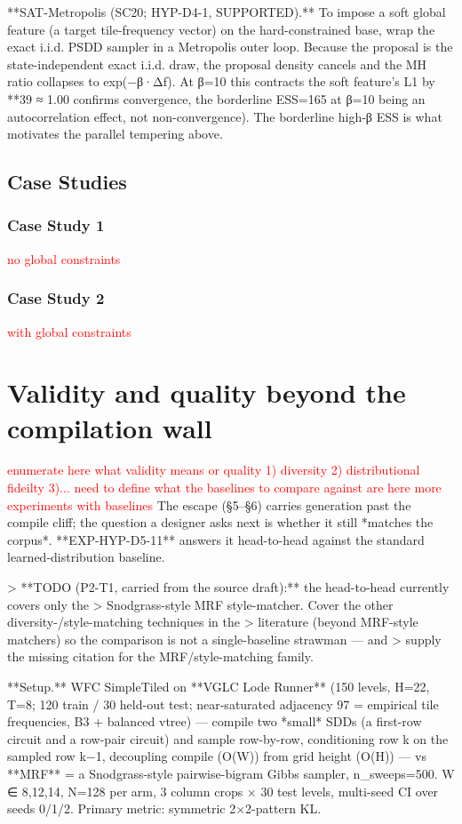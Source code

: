 \documentclass[letterpaper]{article} %
\newcommand{\todo}[1]{\textcolor{red}{#1}}
\begin{document}
**SAT-Metropolis (SC20; HYP-D4-1, SUPPORTED).** To impose a soft global feature (a target
tile-frequency vector) on the hard-constrained base, wrap the exact i.i.d. PSDD sampler in a
Metropolis outer loop. Because the proposal is the state-independent exact i.i.d. draw, the proposal
density cancels and the MH ratio collapses to exp(−β·Δf). At β=10 this contracts the soft feature's
L1 by **39%
≈ 1.00 confirms convergence, the borderline ESS=165 at β=10 being an autocorrelation effect, not
non-convergence). The borderline high-β ESS is what motivates the parallel tempering above.

\subsection{Case Studies}
\subsubsection{Case Study 1}
\todo{no global constraints}
\subsubsection{Case Study 2}
\todo{with global constraints}
\section{Validity and quality beyond the compilation wall}
\todo{enumerate here what validity means or quality 1) diversity 2) distributional fideilty 3)...}
\todo{need to define what the baselines to compare against are here}
\todo{more experiments with baselines}
The escape (§5–§6) carries generation past the compile cliff; the question a designer asks next is
whether it still *matches the corpus*. **EXP-HYP-D5-11** answers it head-to-head against the standard
learned-distribution baseline.

> **TODO (P2-T1, carried from the source draft):** the head-to-head currently covers only the
> Snodgrass-style MRF style-matcher. Cover the other diversity-/style-matching techniques in the
> literature (beyond MRF-style matchers) so the comparison is not a single-baseline strawman — and
> supply the missing citation for the MRF/style-matching family.

**Setup.** WFC SimpleTiled on **VGLC Lode Runner** (150 levels, H=22, T=8; 120 train / 30 held-out
test; near-saturated adjacency 97%
= empirical tile frequencies, B3 + balanced vtree) — compile two *small* SDDs (a first-row circuit and
a row-pair circuit) and sample row-by-row, conditioning row k on the sampled row k−1, decoupling
compile (O(W)) from grid height (O(H)) — vs **MRF** = a Snodgrass-style pairwise-bigram Gibbs
sampler, n_sweeps=500. W ∈ {8,12,14}, N=128 per arm, 3 column crops × 30 test levels, multi-seed CI
over seeds 0/1/2. Primary metric: symmetric 2×2-pattern KL.
\end{document}

